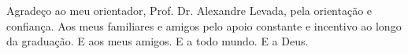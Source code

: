 
\begin{agradecimentos}
Agradeço ao meu orientador, Prof. Dr. Alexandre Levada, pela orientação e confiança.
Aos meus familiares e amigos pelo apoio constante e incentivo ao longo da graduação.
E aos meus amigos. E a todo mundo. E a Deus.
\end{agradecimentos}
